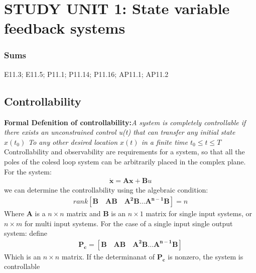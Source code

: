 \documentclass{article}
\begin{document}
\section{STUDY UNIT 1: State variable feedback systems}
\subsubsection{Sums} %
E11.3; E11.5; P11.1; P11.14; P11.16; AP11.1; AP11.2

\subsection{Controllability} %
\label{sub:controllability}
{\bf Formal Defenition of controllability:}\emph{A system is completely controllable if there exists an unconstrained control u(t) that can transfer any initial state $x(t_0)$ To any other desired location $x(t)$ in a finite time $t_0 \leq t \leq T$}\\
Controllability and observability are requirements for a system, so that all the poles of the colesd loop system can be arbitrarily placed in the complex plane.\\
For the system:
\begin{align*}
\dot{\mathbf{x}} = \mathbf{Ax+B}u	
\end{align*}
we can determine the controllability using the algebraic condition:
\begin{align*}
rank[\mathbf{B \quad AB \quad A^2B \ldots A^{n-1}B }] = n	
\end{align*}
Where $\mathbf{A}$ is a $n \times n$ matrix and $\mathbf{B}$ is an $n \times 1$ matrix for single input systems, or $n \times m$ for multi input systems.
For the case of a single input single output system: define
\begin{align*}
\mathbf{P_c = [\mathbf{B \quad AB \quad A^2B \ldots A^{n-1}B }]}	
\end{align*}
Which is an $n \times n$ matrix. If the determinanat of $\mathbf{P_c}$ is nonzero, the system is controllable\\


\end{document}
